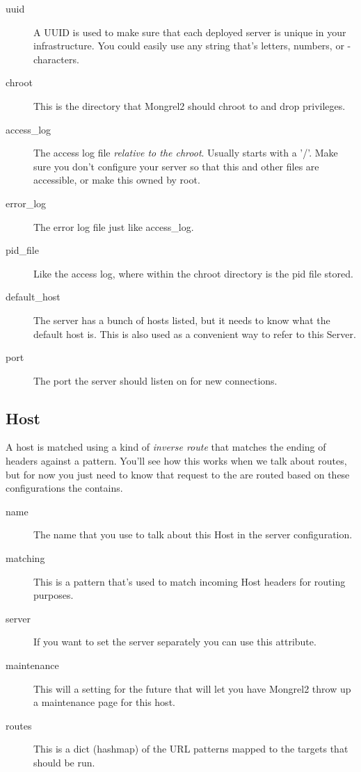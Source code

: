 \begin{description}
\item[uuid] A UUID is used to make sure that each deployed server is unique in your infrastructure.
    You could easily use any string that's letters, numbers, or - characters.
\item[chroot] This is the directory that Mongrel2 should chroot to and drop privileges.
\item[access\_log] The access log file \emph{relative to the chroot}.  Usually starts with a '/'.  Make sure
    you don't configure your server so that this and other files are accessible, or make this owned by root.
\item[error\_log] The error log file just like access_log.
\item[pid\_file] Like the access log, where within the chroot directory is the pid file stored.
\item[default\_host] The server has a bunch of hosts listed, but it needs to know what the default host is.  This is also
    used as a convenient way to refer to this Server.
\item[port] The port the server should listen on for new connections.
\end{description}


\subsection{Host}

A host is matched using a kind of \emph{inverse route} that matches the ending of 
headers against a pattern.  You'll see how this works when we talk about routes, but for now
you just need to know that request to the  are routed based on these 
configurations the  contains.

\begin{description}
\item[name] The name that you use to talk about this Host in the server configuration.
\item[matching] This is a pattern that's used to match incoming Host headers for routing purposes.
\item[server] If you want to set the server separately you can use this attribute.
\item[maintenance] This will a setting for the future that will let you have Mongrel2 throw up a maintenance page
    for this host.
\item[routes] This is a dict (hashmap) of the URL patterns mapped to the targets that should be run.
\end{description}


